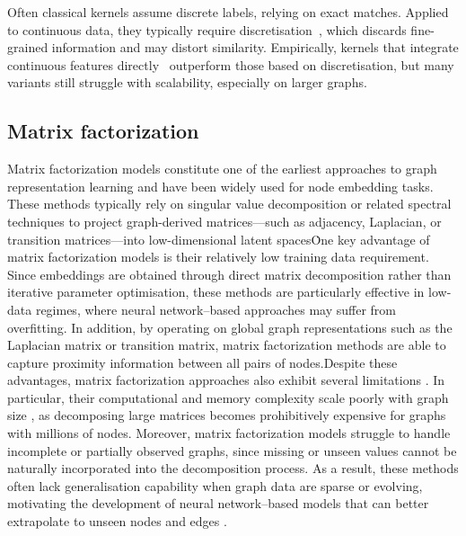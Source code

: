 Often classical kernels assume
discrete labels, relying on exact matches. Applied to continuous data, they
typically require discretisation~\citep{neumann2016scalable}, which discards
fine-grained information and may distort similarity. Empirically, kernels that
integrate continuous features directly~\citep{feragen2013scalable} outperform
those based on discretisation, but many variants still struggle with
scalability, especially on larger graphs. 
\subsection{ Matrix factorization}
Matrix factorization models constitute one of the earliest approaches to graph representation learning and have been widely used for node embedding tasks. These methods typically rely on singular value decomposition or related spectral techniques to project graph-derived matrices—such as adjacency, Laplacian, or transition matrices—into low-dimensional latent spaces\.
One key advantage of matrix factorization models is their relatively low training data requirement. Since embeddings are obtained through direct matrix decomposition rather than iterative parameter optimisation, these methods are particularly effective in low-data regimes, where neural network--based approaches may suffer from overfitting. In addition, by operating on global graph representations such as the Laplacian matrix or transition matrix, matrix factorization methods are able to capture proximity information between all pairs of nodes.Despite these advantages, matrix factorization approaches also exhibit several limitations \citep{hoang2023graph}. In particular, their computational and memory complexity scale poorly with graph size \citep{cao2015grarep}, as decomposing large matrices becomes prohibitively expensive for graphs with millions of nodes. Moreover, matrix factorization models struggle to handle incomplete or partially observed graphs, since missing or unseen values cannot be naturally incorporated into the decomposition process. As a result, these methods often lack generalisation capability when graph data are sparse or evolving, motivating the development of neural network--based models that can better extrapolate to unseen nodes and edges \citep{dettmers2018convolutional}.


